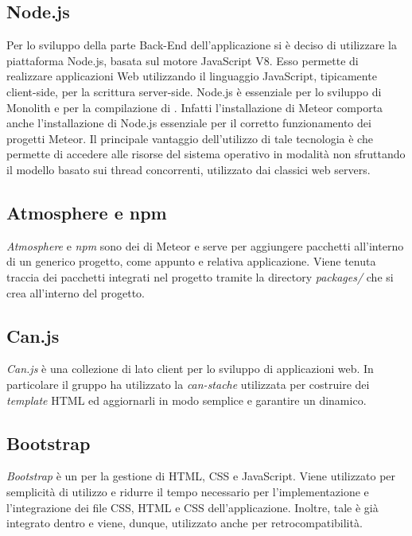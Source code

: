 \subsection{Node.js}
Per lo sviluppo della parte Back-End dell’applicazione si è deciso di utilizzare la piattaforma  Node.js, basata sul motore JavaScript V8. Esso permette di realizzare applicazioni
Web utilizzando il linguaggio JavaScript, tipicamente client-side, per
la scrittura server-side. 
Node.js è essenziale per lo sviluppo di Monolith e per la compilazione di . Infatti l'installazione di Meteor comporta anche l'installazione di Node.js essenziale per il corretto funzionamento dei progetti Meteor. Il principale vantaggio dell'utilizzo di tale tecnologia è che permette di accedere alle risorse del sistema operativo in modalità  non sfruttando il modello basato sui thread concorrenti, utilizzato dai classici web servers.

\subsection{Atmosphere e npm}
\textit{Atmosphere} e \textit{npm} sono dei  di Meteor e serve per aggiungere pacchetti  all'interno di un generico progetto, come appunto  e relativa applicazione. Viene tenuta traccia dei pacchetti integrati nel progetto tramite la directory \textit{packages/} che si crea all'interno del progetto.

\subsection{Can.js}
\textit{Can.js} è una collezione di  lato client per lo sviluppo di applicazioni web. In particolare il gruppo ha utilizzato la  \textit{can-stache} utilizzata per costruire dei \textit{template} HTML ed aggiornarli in modo semplice e garantire un  dinamico.

\subsection{Bootstrap}
\textit{Bootstrap} è un  per la gestione di HTML, CSS e JavaScript. Viene utilizzato per semplicità di utilizzo e ridurre il tempo necessario per l'implementazione e l'integrazione dei file CSS, HTML e CSS dell'applicazione. Inoltre, tale  è già integrato dentro  e viene, dunque, utilizzato anche per retrocompatibilità.

